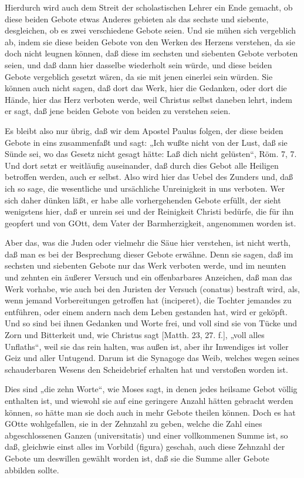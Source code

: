 Hierdurch wird auch dem Streit der scholastischen Lehrer ein Ende gemacht, ob diese beiden Gebote etwas Anderes gebieten als das sechste und siebente, desgleichen, ob es zwei verschiedene Gebote seien. Und sie mühen sich vergeblich ab, indem sie diese beiden Gebote von den Werken des Herzens verstehen, da sie doch nicht leugnen können, daß diese im sechsten und siebenten Gebote verboten seien, und daß dann hier dasselbe wiederholt sein würde, und diese beiden Gebote vergeblich gesetzt wären, da sie mit jenen einerlei sein würden. Sie können auch nicht sagen, daß dort das Werk, hier die Gedanken, oder dort die Hände, hier das Herz verboten werde, weil Christus selbst daneben lehrt, indem er sagt, daß jene beiden Gebote von beiden zu verstehen seien.

Es bleibt also nur übrig, daß wir dem Apostel Paulus folgen, der diese beiden Gebote in eins zusammenfaßt und sagt: „Ich wußte nicht von der Lust, daß sie Sünde sei, wo das Gesetz nicht gesagt hätte: Laß dich nicht gelüsten“, Röm. 7, 7. Und dort setzt er weitläufig auseinander, daß durch dies Gebot alle Heiligen betroffen werden, auch er selbst. Also wird hier das Uebel des Zunders und, daß ich so sage, die wesentliche und ursächliche Unreinigkeit in uns verboten. Wer sich daher dünken läßt, er habe alle vorhergehenden Gebote erfüllt, der sieht wenigstens hier, daß er unrein sei und der Reinigkeit Christi bedürfe, die für ihn geopfert und von GOtt, dem Vater der Barmherzigkeit, angenommen worden ist.

Aber das, was die Juden oder vielmehr die Säue hier verstehen, ist nicht werth, daß man es bei der Besprechung dieser Gebote erwähne. Denn sie sagen, daß im sechsten und siebenten Gebote nur das Werk verboten werde, und im neunten und zehnten ein äußerer Versuch und ein offenbarbares Anzeichen, daß man das Werk vorhabe, wie auch bei den Juristen der Versuch (conatus) bestraft wird, als, wenn jemand Vorbereitungen getroffen hat (inciperet), die Tochter jemandes zu entführen, oder einem andern nach dem Leben gestanden hat, wird er geköpft. Und so sind bei ihnen Gedanken und Worte frei, und voll sind sie von Tücke und Zorn und Bitterkeit und, wie Christus sagt [Matth. 23, 27. f.], „voll alles Unflaths“, weil sie das rein halten, was außen ist, aber ihr Inwendiges ist voller Geiz und aller Untugend. Darum ist die Synagoge das Weib, welches wegen seines schauderbaren Wesens den Scheidebrief erhalten hat und verstoßen worden ist.

Dies sind „die zehn Worte“, wie Moses sagt, in denen jedes heilsame Gebot völlig enthalten ist, und wiewohl sie auf eine geringere Anzahl hätten gebracht werden können, so hätte man sie doch auch in mehr Gebote theilen können. Doch es hat GOtte wohlgefallen, sie in der Zehnzahl zu geben, welche die Zahl eines abgeschlossenen Ganzen (universitatis) und einer vollkommenen Summe ist, so daß, gleichwie einst alles im Vorbild (figura) geschah, auch diese Zehnzahl der Gebote um deswillen gewählt worden ist, daß sie die Summe aller Gebote abbilden sollte.

